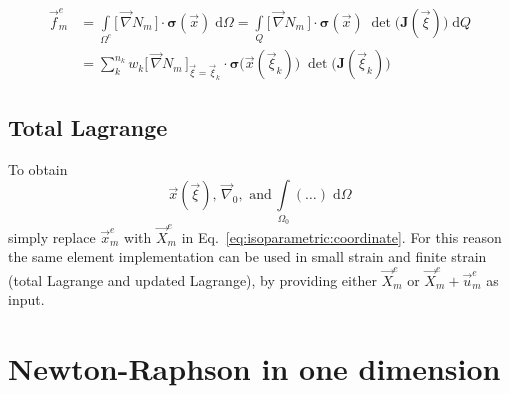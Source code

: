 \documentclass[times,namecite]{goose-article}
\begin{document}
\begin{align}
  \vec{f}_m^e
  &=
  \int\limits_{\Omega^e}
    \big[\, \vec{\nabla} N_m \,\big]
    \cdot
    \bm{\sigma}(\vec{x}) \;
  \mathrm{d}\Omega
  =
  \int\limits_{Q}
    \big[\, \vec{\nabla} N_m \,\big]
    \cdot
    \bm{\sigma}(\vec{x}) \;
    \det \big( \bm{J}(\vec{\xi}) \big) \;
  \mathrm{d}Q
  \\
  &=
  \sum_{k}^{n_k}
  w_k
  \big[\, \vec{\nabla} N_m \,\big]_{\vec{\xi} = \vec{\xi}_k}
  \cdot
  \bm{\sigma}\big(\vec{x}(\vec{\xi}_k)\big) \;
  \det \big( \bm{J}(\vec{\xi}_k) \big) \;
\end{align}

\subsection*{Total Lagrange}

To obtain
\begin{equation}
 \vec{x}(\vec{\xi}),\, \vec{\nabla}_0,\,\, \text{and}\, \int\limits_{\Omega_0} (\ldots) \;\mathrm{d}\Omega
\end{equation}
simply replace $\vec{x}_m^e$ with $\vec{X}_m^e$ in Eq.~\eqref{eq:isoparametric:coordinate}. For this reason the same element implementation can be used in small strain and finite strain (total Lagrange and updated Lagrange), by providing either $\vec{X}_m^e$ or $\vec{X}_m^e + \vec{u}_m^e$ as input.


\section{Newton-Raphson in one dimension}
\label{sec:newton-raphson}
\end{document}
